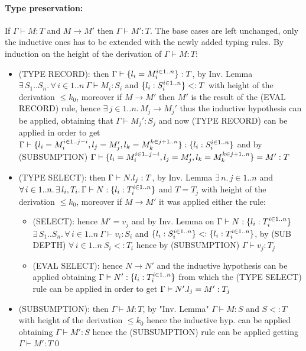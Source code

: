 \paragraph*{Type preservation:\\}
If $\Gamma \vdash M: T$ and $M \to M'$ then $\Gamma \vdash M': T$.
The base cases are left unchanged, only the inductive ones has to be extended with the newly
added typing rules.
By induction on the height of the derivation of $\Gamma \vdash M: T$:
\begin{itemize}
	\item (TYPE RECORD): then $\Gamma \vdash \{l_i=M_i^{i \in 1..n}\}: T$, by Inv. Lemma
	      $\exists\, S_1..S_n.\,\forall\, i \in 1..n\ \Gamma \vdash M_i: S_i$ and
	      $\{l_i: S_i^{i \in 1..n}\} <: T$ with height of the derivation $\le k_0$, moreover if
	      $M \to M'$ then $M'$ is the result of the (EVAL RECORD) rule, hence
	      $\exists\, j \in 1..n.\, M_j \to M_j'$ thus the inductive hypothesis can be applied,
	      obtaining that $\Gamma \vdash M_j': S_j$ and now (TYPE RECORD) can be applied in order to
	      get $\Gamma \vdash \{l_i=M_i^{i \in 1..j-i}, l_j=M_j', l_k = M_k^{k \in j+1..n}\}: \{l_i: S_i^{i \in 1..n}\}$
	      and by (SUBSUMPTION) $\Gamma \vdash \{l_i=M_i^{i \in 1..j-i}, l_j=M_j', l_k = M_k^{k \in j+1..n}\} = M': T$
	\item (TYPE SELECT): then $\Gamma \vdash N.l_j: T$, by Inv. Lemma
	      $\exists\, n.\, j \in 1..n$ and
	      $\forall\, i \in 1..n.\, \exists\, l_i, T_i.\, \Gamma \vdash N: \{l_i: T_i^{i \in 1..n}\}$
	      and $T = T_j$ with height of the derivation $\le k_0$, moreover if $M \to M'$ it was applied either the rule:
	      \begin{itemize}
		      \item (SELECT): hence $M' = v_j$ and by Inv. Lemma on $\Gamma \vdash N: \{l_i: T_i^{i \in 1..n}\}$
		            $\exists\, S_1..S_n.\,\forall\, i \in 1..n\ \Gamma \vdash v_i: S_i$ and
		            $\{l_i: S_i^{i \in 1..n}\} <: \{l_i: T_i^{i \in 1..n}\}$, by (SUB DEPTH)
		            $\forall\, i \in 1..n\ S_i <: T_i$ hence by (SUBSUMPTION) $\Gamma \vdash v_j: T_j$
		      \item (EVAL SELECT): hence $N \to N'$ and the inductive hypothesis can be applied
		            obtaining $\Gamma \vdash N': \{l_i: T_i^{i \in 1..n}\}$ from  which the
		            (TYPE SELECT) rule can be applied in order to get $\Gamma \vdash N'.l_j = M': T_j$
	      \end{itemize}
	\item (SUBSUMPTION): then $\Gamma \vdash M: T$, by "Inv. Lemma" $\Gamma \vdash M: S$
	      and $S <: T$ with height of the derivation $\le k_0$ hence the inductive hyp. can be
	      applied obtaining $\Gamma \vdash M': S$ hence the (SUBSUMPTION) rule can
	      be applied getting $\Gamma \vdash M': T$\qed
\end{itemize}
